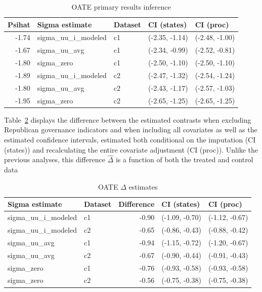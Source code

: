 \begin{table}[ht]
\centering
\caption{OATE primary results inference}
\label{tab:oateconfint}
\begin{tabular}{rllll}
  \hline
Psihat & Sigma estimate & Dataset & CI (states) & CI (proc) \\ 
  \hline
-1.74 & sigma\_uu\_i\_modeled & c1 & (-2.35, -1.14) & (-2.48, -1.00) \\ 
  -1.67 & sigma\_uu\_avg & c1 & (-2.34, -0.99) & (-2.52, -0.81) \\ 
  -1.80 & sigma\_zero & c1 & (-2.50, -1.10) & (-2.50, -1.10) \\ 
  -1.89 & sigma\_uu\_i\_modeled & c2 & (-2.47, -1.32) & (-2.54, -1.24) \\ 
  -1.80 & sigma\_uu\_avg & c2 & (-2.43, -1.17) & (-2.57, -1.03) \\ 
  -1.95 & sigma\_zero & c2 & (-2.65, -1.25) & (-2.65, -1.25) \\ 
   \hline
\end{tabular}
\end{table}

Table~\ref{tab:oaterepubdiff} displays the difference between the estimated contrasts when excluding Republican governance indicators and when including all covariates as well as the estimated confidence intervals, estimated both conditional on the imputation (CI (states)) and recalculating the entire covariate adjustment (CI (proc)). Unlike the previous analyses, this difference $\hat{\Delta}$ is a function of both the treated and control data

\begin{table}[ht]
\centering
\caption{OATE $\hat{\Delta}$ estimates}
\label{tab:oaterepubdiff}
\begin{tabular}{llrll}
  \hline
Sigma estimate & Dataset & Difference & CI (states) & CI (proc) \\ 
  \hline
sigma\_uu\_i\_modeled & c1 & -0.90 & (-1.09, -0.70) & (-1.12, -0.67) \\ 
  sigma\_uu\_i\_modeled & c2 & -0.65 & (-0.86, -0.43) & (-0.88, -0.42) \\ 
  sigma\_uu\_avg & c1 & -0.94 & (-1.15, -0.72) & (-1.20, -0.67) \\ 
  sigma\_uu\_avg & c2 & -0.67 & (-0.90, -0.44) & (-0.91, -0.43) \\ 
  sigma\_zero & c1 & -0.76 & (-0.93, -0.58) & (-0.93, -0.58) \\ 
  sigma\_zero & c2 & -0.56 & (-0.75, -0.38) & (-0.75, -0.38) \\ 
   \hline
\end{tabular}
\end{table}

